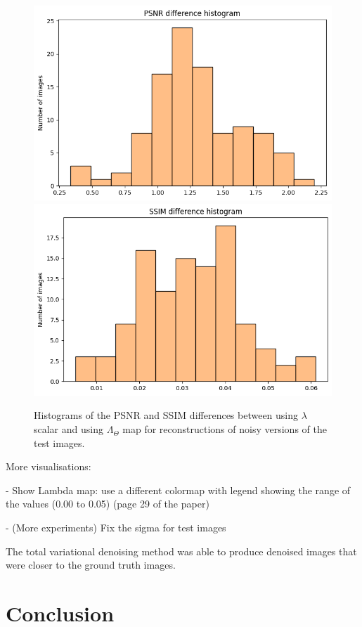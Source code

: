 \documentclass[12pt]{article}
\begin{document}
\begin{figure}[h]
  \centering
  \includegraphics[width=0.48\linewidth]{images//chest_xray/hist_psnr_diff.png}
  \includegraphics[width=0.48\linewidth]{images//chest_xray/hist_ssim_diff.png}
  \caption{Histograms of the PSNR and SSIM differences between using $\lambda$ scalar and using $\Lambda_{\Theta}$ map for
  reconstructions of noisy versions of the test images. 
  }
  \label{fig:hist_diff}
\end{figure}



More visualisations:


- Show Lambda map: use a different colormap with legend showing the range of the values (0.00 to 0.05) (page 29 of the paper)



- (More experiments) Fix the sigma for test images




The total variational denoising method was able to produce denoised images that were closer to the ground truth images.


\section{Conclusion}
\end{document}
